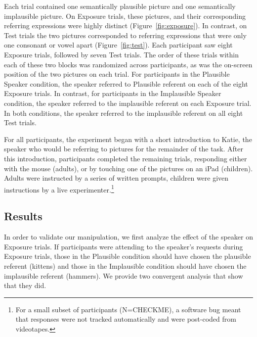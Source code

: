 \documentclass[man,floatsintext]{apa6}
\begin{document}
Each trial contained one semantically plausible picture and one semantically implausible picture. On Exposure trials, these pictures, and their corresponding referring expressions were highly distinct (Figure~\ref{fig:exposure}). In contrast, on Test trials the two pictures corresponded to referring expressions that were only one consonant or vowel apart (Figure~\ref{fig:test}). Each participant saw eight Exposure trials, followed by seven Test trials. The order of these trials within each of these two blocks was randomized across participants, as was the on-screen position of the two pictures on each trial. For participants in the Plausible Speaker condition, the speaker referred to Plausible referent on each of the eight Exposure trials. In contrast, for participants in the Implausible Speaker condition, the speaker referred to the implausible referent on each Exposure trial. In both conditions, the speaker referred to the implausible referent on all eight Test trials.

For all participants, the experiment began with a short introduction to Katie, the speaker who would be referring to pictures for the remainder of the task. After this introduction, participants completed the remaining trials, responding either with the mouse (adults), or by touching one of the pictures on an iPad (children). Adults were instructed by a series of written prompts, children were given instructions by a live experimenter.\footnote{For a small subset of participants (N=CHECKME), a software bug meant that responses were not tracked automatically and were post-coded from videotapes.}

\subsection{Results}

In order to validate our manipulation, we first analyze the effect of the speaker on Exposure trials. If participants were attending to the speaker's requests during Exposure trials, those in the Plausible condition should have chosen the plausible referent (kittens) and those in the Implausible condition should have chosen the implausible referent (hammers). We provide two convergent analysis that show that they did. 
\end{document}
